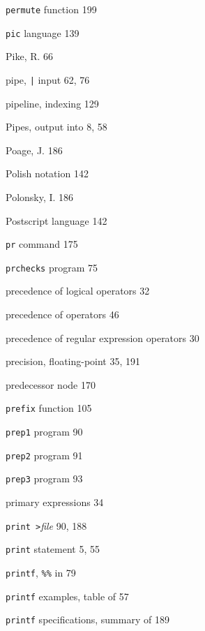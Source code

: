 \begin{multicols}{3}
\hangindent=3pc  \verb'permute' function 199

\hangindent=3pc  \verb'pic' language 139

\hangindent=3pc  Pike, R. 66

\hangindent=3pc  pipe, \verb'|' input 62, 76

\hangindent=3pc  pipeline, indexing 129

\hangindent=3pc  Pipes, output into 8, 58

\hangindent=3pc  Poage, J. 186

\hangindent=3pc  Polish notation 142

\hangindent=3pc  Polonsky, I. 186

\hangindent=3pc  Postscript language 142

\hangindent=3pc  \verb'pr' command 175

\hangindent=3pc  \verb'prchecks' program 75

\hangindent=3pc  precedence of logical operators 32

\hangindent=3pc  precedence of operators 46

\hangindent=3pc  precedence of regular expression operators 30

\hangindent=3pc  precision, floating-point 35, 191

\hangindent=3pc  predecessor node 170

\hangindent=3pc  \verb'prefix' function 105

\hangindent=3pc  \verb'prep1' program 90

\hangindent=3pc  \verb'prep2' program 91

\hangindent=3pc  \verb'prep3' program 93

\hangindent=3pc  primary expressions 34

\hangindent=3pc  \verb'print >'\textit{file} 90, 188

\hangindent=3pc  \verb'print' statement 5, 55

\hangindent=3pc  \verb'printf', \verb'%%' in 79

\hangindent=3pc  \verb'printf' examples, table of 57

\hangindent=3pc  \verb'printf' specifications, summary of 189


\end{multicols}

